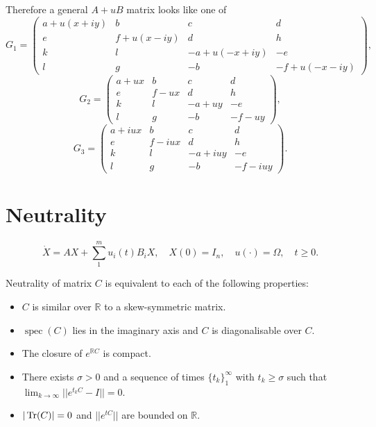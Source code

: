 Therefore a general $A+uB$ matrix looks like one of
\begin{equation}
G_1 = \begin{pmatrix} a+u(x+iy) & b & c & d \\ e & f+u(x-iy) & d & h \\k & l & -a+u(-x+iy) & -e \\l & g & -b & -f+u(-x-iy) \end{pmatrix},
\end{equation}
\begin{equation}
G_2 = \begin{pmatrix} a+ux & b & c & d \\ e & f-ux & d & h \\k & l & -a+uy & -e \\l & g & -b & -f-uy \end{pmatrix},
\end{equation}
\begin{equation}
G_3 = \begin{pmatrix} a+iux & b & c & d \\ e & f-iux & d & h \\k & l & -a+iuy & -e \\l & g & -b & -f-iuy \end{pmatrix}.
\end{equation}

\section{Neutrality}
\begin{equation}
 \dot{X} = AX + \sum_{1}^m u_i(t)B_iX, \quad X(0)=I_n, \quad u(\cdot)=\Omega, \quad t \geq 0. \label{eq:opcont}
\end{equation}



\begin{definition}[Elliott p97]
Neutrality of matrix $C$ is equivalent to each of the following properties:
\begin{itemize}
 \item $C$ is similar over $\mathbb{R}$ to a skew-symmetric matrix.
\item $\operatorname{spec}(C)$ lies in the imaginary axis and $C$ is diagonalisable over $C$.
\item The closure of $e^{\mathbb{R}C}$ is compact.
\item There exists $\sigma > 0$ and a sequence of times $\{t_k\}_1^\infty$ with $t_k \geq \sigma$ such that $\lim_{k\to\infty}||e^{t_kC}-I|| = 0$.
\item $| \operatorname{Tr}(C)| = 0$ and $||e^{tC}||$ are bounded on $\mathbb{R}$.
\end{itemize}
\end{definition}

